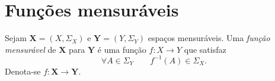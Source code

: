 
\section{Funções mensuráveis}

\begin{defi}
Sejam $\bm X = (X,\Sigma_X)$ e $\bm Y = (Y,\Sigma_Y)$ espaços mensuráveis. Uma \emph{função mensurável} de $\bm X$ para $\bm Y$ é uma função $f: X \to Y$ que satisfaz
	\begin{equation*}
	\forall A \in \Sigma_Y \qquad f^{-1}(A) \in \Sigma_X.
	\end{equation*}
Denota-se $f: \bm X \to \bm Y$.
\end{defi}

